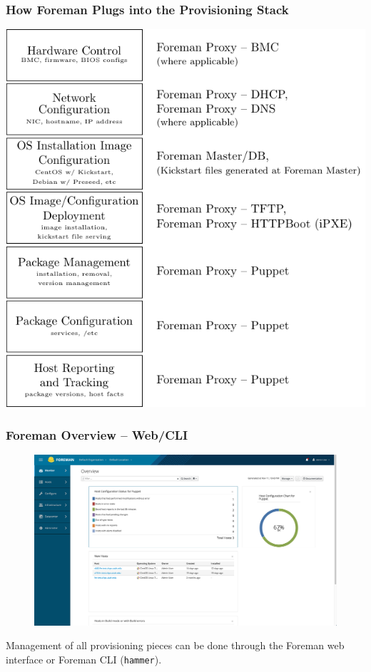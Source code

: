 \documentclass{beamer}
\begin{document}
\begin{frame}[fragile]
 \frametitle{How Foreman Plugs into the Provisioning Stack}
 \begin{center}
  \includegraphics[width=\textwidth,height=\textheight-15mm,keepaspectratio]{provisioning_foreman_diagram}
 \end{center}
\end{frame}


\begin{frame}
 \frametitle{Foreman Overview -- Web/CLI}

 \begin{figure}[t]
  \includegraphics[width=\textwidth,height=\textheight-3cm,keepaspectratio]{foreman-web}
 \end{figure}

 Management of all provisioning pieces can be done through the Foreman web interface or Foreman CLI (\texttt{hammer}).


\end{frame}
\end{document}
